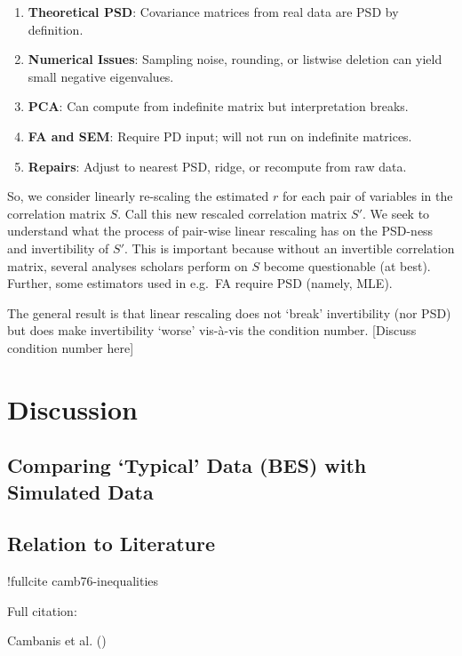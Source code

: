 \documentclass[
  12pt,
]{article}
\providecommand{\tightlist}{%
  \setlength{\itemsep}{0pt}\setlength{\parskip}{0pt}}
\theoremstyle{plain}
\theoremstyle{definition}
\theoremstyle{remark}
\begin{document}
\begin{enumerate}
\def\labelenumi{\arabic{enumi}.}
\tightlist
\item
  \textbf{Theoretical PSD}: Covariance matrices from real data are PSD
  by definition.
\item
  \textbf{Numerical Issues}: Sampling noise, rounding, or listwise
  deletion can yield small negative eigenvalues.
\item
  \textbf{PCA}: Can compute from indefinite matrix but interpretation
  breaks.
\item
  \textbf{FA and SEM}: Require PD input; will not run on indefinite
  matrices.
\item
  \textbf{Repairs}: Adjust to nearest PSD, ridge, or recompute from raw
  data.
\end{enumerate}

So, we consider linearly re-scaling the estimated \(r\) for each pair of
variables in the correlation matrix \(S\). Call this new rescaled
correlation matrix \(S'\). We seek to understand what the process of
pair-wise linear rescaling has on the PSD-ness and invertibility of
\(S'\). This is important because without an invertible correlation
matrix, several analyses scholars perform on \(S\) become questionable
(at best). Further, some estimators used in e.g.~FA require PSD (namely,
MLE).

The general result is that linear rescaling does not `break'
invertibility (nor PSD) but does make invertibility `worse' vis-à-vis
the condition number. {[}Discuss condition number here{]}

\section{Discussion}\label{discussion}

\subsection{Comparing `Typical' Data (BES) with Simulated
Data}\label{comparing-typical-data-bes-with-simulated-data}

\subsection{Relation to Literature}\label{relation-to-literature}

!fullcite camb76-inequalities

Full citation:

{Cambanis et al. ()}
\end{document}
